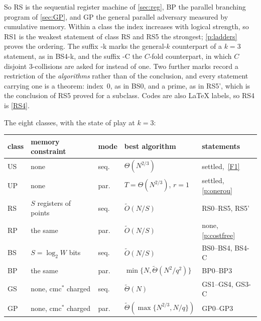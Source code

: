 \documentclass[11pt]{article}
\theoremstyle{plain}
\theoremstyle{definition}
\newcommand{\cmcs}{\mathrm{cmc}^{*}}
\newcommand{\cls}[1]{\textsf{#1}}   %
\begin{document}
\medskip\noindent
So \cls{RS} is the sequential register machine of
\cref{sec:reg}, \cls{BP} the parallel branching program of
\cref{sec:GP}, and \cls{GP} the general parallel adversary measured
by cumulative memory.  Within a class the index increases with logical
strength, so \textsf{RS1} is the weakest statement of class \cls{RS} and
\textsf{RS5} the strongest; \cref{p:ladders} proves the ordering.  The
suffix \textsf{-k} marks the general-$k$ counterpart of a $k=3$ statement,
as in \textsf{BS4-k}, and the suffix \textsf{-C} the $C$-fold counterpart,
in which $C$ disjoint $3$-collisions are asked for instead of one.  Two
further marks record a restriction of the \emph{algorithms} rather than of
the conclusion, and every statement carrying one is a theorem: index~$0$,
as in \textsf{BS0}, and a prime, as in \textsf{RS5'}, which is the
conclusion of \textsf{RS5} proved for a subclass.  Codes are also
\LaTeX{} labels, so \textsf{RS4} is \cref{RS4}.

The eight classes, with the state of play at $k=3$:

\begin{center}
\small
\begin{tabular}{@{}lllll@{}}
\toprule
class & memory constraint & mode & best algorithm & statements \\
\midrule
\cls{US} & none                  & seq. & $\Theta(N^{2/3})$ & settled,~\ref{F1} \\
\cls{UP} & none                  & par. & $T=\Theta(N^{2/3})$, $r=1$ & settled, \cref{p:onerou} \\
\cls{RS} & $S$ registers of points & seq. & $\tilde O(N/S)$ & \textsf{RS0}--\textsf{RS5}, \textsf{RS5'} \\
\cls{RP} & the same              & par. & $\tilde O(N/S)$ & none, \cref{p:costfree} \\
\cls{BS} & $S = \log_{2} W$ bits & seq. & $\tilde O(N/S)$ & \textsf{BS0}--\textsf{BS4}, \textsf{BS4-C} \\
\cls{BP} & the same              & par. & $\min\{N,\tilde\Theta(N^{2}/q^{2})\}$ & \textsf{BP0}--\textsf{BP3} \\
\cls{GS} & none, $\cmcs$ charged & seq. & $\tilde\Theta(N)$ & \textsf{GS1}--\textsf{GS4}, \textsf{GS3-C} \\
\cls{GP} & none, $\cmcs$ charged & par. & $\tilde\Theta(\max\{N^{2/3},N/q\})$ & \textsf{GP0}--\textsf{GP3} \\
\bottomrule
\end{tabular}
\end{center}
\end{document}
